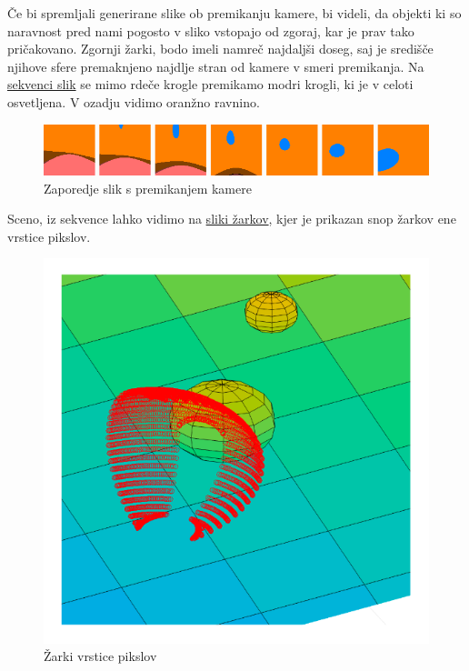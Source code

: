 \documentclass[titlepage]{article}
\begin{document}
\bigskip
Če bi spremljali generirane slike ob premikanju kamere, bi videli, da objekti ki so naravnost pred nami pogosto v sliko vstopajo od zgoraj, kar je prav tako pričakovano. Zgornji žarki, bodo imeli namreč najdaljši doseg, saj je središče njihove sfere premaknjeno najdlje stran od kamere v smeri premikanja. Na \hyperref[fig:sequence]{sekvenci slik} se mimo rdeče krogle premikamo modri krogli, ki je v celoti osvetljena. V ozadju vidimo oranžno ravnino.
\begin{figure}[H]
    \centering
    \includegraphics[width=1\linewidth]{Images/sequence.png}
    \caption{Zaporedje slik s premikanjem kamere}
    \label{fig:sequence}
\end{figure}
Sceno, iz sekvence lahko vidimo na \hyperref[fig:2sphRays2]{sliki žarkov}, kjer je prikazan snop žarkov ene vrstice pikslov.
\begin{figure}[H]
    \centering
    \includegraphics[width=0.5\linewidth]{Images/2sphere_rays2.png}
    \caption{Žarki vrstice pikslov}
    \label{fig:2sphRays2}
\end{figure}
\end{document}
